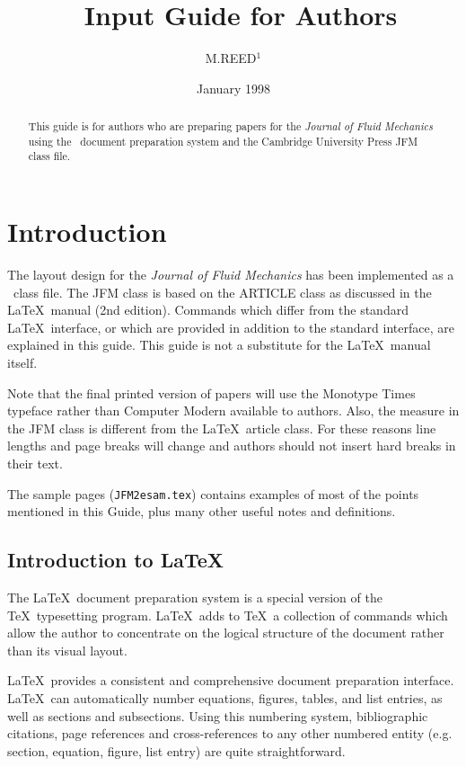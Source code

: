 \documentclass{jfm}
\title[Journal of Fluid Mechanics]{\LaTeXe\ Input Guide for Authors}
\author[M. Reed]{M.\ns R\ls E\ls E\ls D$^1$}
\affiliation{$^1$TAG Group, Cambridge University Press, Cambridge}
\date{January 1998}
\newcommand\eg{e.g.\ }
\begin{document}
\label{firstpage}
\maketitle

\begin{abstract}
This guide is for authors who are preparing papers for the
\emph{Journal of Fluid Mechanics}
using the \LaTeXe\ document preparation system and the Cambridge
University Press JFM class file.
\end{abstract}

\tableofcontents

\section{Introduction}

The layout design for the \emph{Journal of Fluid Mechanics} has been
implemented as a \LaTeXe\ class file. The JFM class is based on the ARTICLE
class as discussed in the \LaTeX\ manual (2nd edition).
Commands which differ from the standard \LaTeX\ interface, or which are
provided in addition to the standard interface, are explained in this
guide. This guide is not a substitute for the \LaTeX\ manual itself.

Note that the final printed version of papers will use the Monotype Times
typeface rather than Computer Modern available to authors. Also,
the measure in the JFM class is different from the \LaTeX\ article class. For
these reasons line lengths and page breaks will change and authors
should not insert hard breaks in their text.

The sample pages (\verb"JFM2esam.tex") contains examples of most of the points
mentioned in this Guide, plus many other useful notes and definitions.

\subsection{Introduction to \LaTeX}

The \LaTeX\ document preparation system is a special version of the
\TeX\ typesetting program.
 \LaTeX\ adds to \TeX\ a collection of commands which allow the author
to concentrate on the logical structure of the document rather than its
visual layout.

\LaTeX\ provides a consistent and comprehensive document preparation
interface.
\LaTeX\ can automatically number equations, figures,
tables, and list entries, as well as sections and
subsections.
Using this numbering system, bibliographic citations, page references
and cross-references to any other numbered entity (\eg
section, equation, figure, list entry) are quite straightforward.
\end{document}
